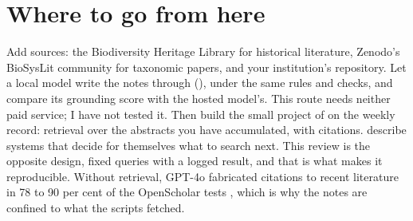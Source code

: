 \section{Where to go from here}

Add sources: the Biodiversity Heritage Library for historical literature,
Zenodo's BioSysLit community for taxonomic papers, and your institution's
repository. Let a local model write the notes through 
(), under the same rules and checks, and compare its
grounding score with the hosted model's. This route needs neither paid
service; I have not tested it. Then build the small project of
 on the weekly record: retrieval over the abstracts you
have accumulated, with citations. \textcite{zhang2025deepresearch} describe
systems that decide for themselves what to search next. This review is the
opposite design, fixed queries with a logged result, and that is what makes
it reproducible. Without retrieval, GPT-4o fabricated citations to recent
literature in 78 to 90 per cent of the OpenScholar tests
\parencite{asai2026openscholar}, which is why the notes are confined to what
the scripts fetched.
